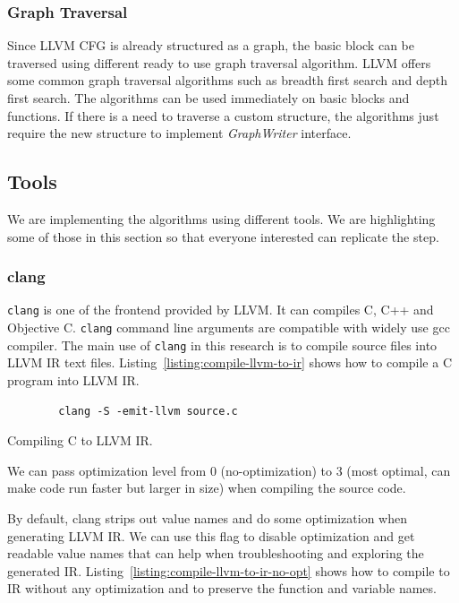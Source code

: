 \subsubsection{Graph Traversal}

Since LLVM CFG is already structured as a graph, the basic block can be
traversed using different ready to use graph traversal algorithm. LLVM offers
some common graph traversal algorithms such as breadth first search and depth
first search. The algorithms can be used immediately on basic blocks and
functions. If there is a need to traverse a custom structure, the algorithms
just require the new structure to implement \emph{GraphWriter} interface.

\subsection{Tools}

We are implementing the algorithms using different tools. We are highlighting
some of those in this section so that everyone interested can replicate the
step.

\subsubsection{clang}

\texttt{clang} is one of the frontend provided by LLVM. It can compiles C, C++
and Objective C. \texttt{clang} command line arguments are compatible with
widely use gcc compiler. The main use of \texttt{clang} in this research is to
compile source files into LLVM IR text files.
Listing~\ref{listing:compile-llvm-to-ir} shows how to compile a C program into
LLVM IR. 

\begin{listing}[htbp]
    \begin{verbatim}
        clang -S -emit-llvm source.c
    \end{verbatim}
    \caption{Compiling C to LLVM IR.}    
    \label{listing:compile-llvm-to-ir}
\end{listing}
    
We can pass optimization level from 0 (no-optimization) to 3 (most optimal, can
make code run faster but larger in size) when compiling the source code.

By default, clang strips out value names and do some optimization when
generating LLVM IR. We can use this flag to disable optimization and get
readable value names that can help when troubleshooting and exploring the
generated IR. Listing~\ref{listing:compile-llvm-to-ir-no-opt} shows how to
compile to IR without any optimization and to preserve the function and variable
names.

